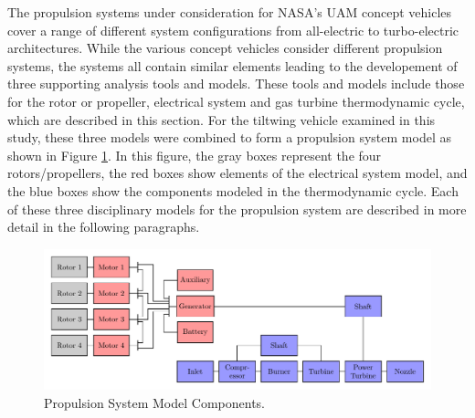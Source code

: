 
The propulsion systems under consideration for NASA's UAM concept vehicles cover a range of different system configurations from all-electric to turbo-electric architectures.
While the various concept vehicles consider different propulsion systems, the systems all contain similar elements leading to the developement of three supporting analysis tools and models.
These tools and models include those for the rotor or propeller, electrical system and gas turbine thermodynamic cycle, which are described in this section.  
For the tiltwing vehicle examined in this study, these three models were combined to form a propulsion system model as shown in Figure \ref{f:turboelectric}. 
In this figure, the gray boxes represent the four rotors/propellers, the red boxes show elements of the electrical system model, and the blue boxes show the components modeled in the thermodynamic cycle.
Each of these three disciplinary models for the propulsion system are described in more detail in the following paragraphs.


\begin{figure}[htb]
\begin{center}
 \includegraphics[width=1.0\textwidth]{../Images/Propulsion_system.pdf}
 \caption{Propulsion System Model Components.}
 \label{f:turboelectric}
\end{center}
\end{figure}


